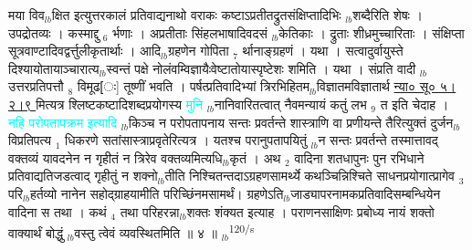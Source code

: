 \documentclass[article,12pt,a4paper]{memoir}%
\newcommand{\quotelemma}[1]{\textcolor{cyan}{#1}}
\newcounter{parCount}
\begin{document}
मया विव{\tiny $_{lb}$}क्षित इत्युत्तरकालं प्रतिवाद्यनाथो वराकः कष्टाऽप्रतीतद्रुतसंक्षिप्तादिभिः {\tiny $_{lb}$}शब्दैरिति शेषः । उपद्रोतव्यः । कस्माद्दु {\tiny $_{6}$} र्भणाः । अप्रतीताः सिंहलभाषादिवदसं {\tiny $_{lb}$}केतिकाः । द्रुताः शीध्रमुच्चारिताः । संक्षिप्ता सूत्रवाण्टादिवद्वर्त्तुलीकृतार्थाः । आदि{\tiny $_{lb}$}ग्रहणेन गोपिता {\tiny $_{7}$} र्थानाङ्ग्रहणं । यथा । सत्वादुर्वायुस्ते दिश्यायोतायाञ्चारात्य{\tiny $_{lb}$}स्वन्तं पक्षे नोलंवम्विज्ञायैःवेष्टातोयास्पृष्टेशः शमिति । यथा । संप्रति वादी {\tiny $_{lb}$}उत्तरप्रतिपत्तौ {\tiny $_{8}$} विमूढ[ः] तूष्णीं भवति । पर्षत्प्रतिवादिभ्यां त्रिरभिहितम{\tiny $_{lb}$}विज्ञातमविज्ञातार्थ \href{http://sarit.indology.info/?cref=ns\%C5\%AB.5.2.9}{न्या० सू० ५।२।९ } मित्यत्र श्लिष्टकष्टादिशब्दप्रयोगस्य \quotelemma{मुनि} {\tiny $_{lb}$}नानिवारितत्वात् नैवमन्यायं कतुं लभ {\tiny $_{9}$} \leavevmode{} त इति चेदाह । \quotelemma{नहि परोपतापक्रम इत्यादि} {\tiny $_{lb}$}किञ्च न परोपतापनाय सन्तः प्रवर्तन्ते शास्त्राणि वा प्रणीयन्ते तैरित्युक्तं दुर्जन{\tiny $_{lb}$}विप्रतिपत्य {\tiny $_{1}$} धिकरणे सतांसास्त्राप्रवृतेरित्यत्र । यतश्च परानुपतापयितुं {\tiny $_{lb}$}न सन्तः प्रवर्तन्ते तस्मात्तावद् वक्तव्यं यावदनेन न गृहीतं न त्रिरेव वक्तव्यमित्यधि{\tiny $_{lb}$}कृतं । अथ {\tiny $_{2}$} वादिना शतधापुनः पुन रभिधाने प्रतिवाद्यतिजडत्वाद् गृहीतुं न शक्नो{\tiny $_{lb}$}तीति निश्चितन्तदाऽग्रहणसामर्थ्ये कथञ्चिन्निश्चिते साधनप्रयोगात्प्रागेव {\tiny $_{3}$} परि{\tiny $_{lb}$}हर्तव्यो नानेन सहोद्ग्राहयामीति परिच्छिंनमसामर्थं। ग्रहणेऽति{\tiny $_{lb}$}जाड्यापरनामकप्रतिवादिसम्बन्धियेन वादिना स तथा । कथं {\tiny $_{4}$} तथा परिहरन्ना{\tiny $_{lb}$}शक्तः शंक्यत इत्याह । पराणनसाक्षिणः प्रबोध्य नायं शक्तो वाक्यार्थं बोद्धुं {\tiny $_{lb}$}वस्तु त्वेवं व्यवस्थितमिति ॥ ४ ॥
	{}
	\pend%
      {\tiny $_{lb}$}\textsuperscript{\textenglish{120/s}}
\end{document}
